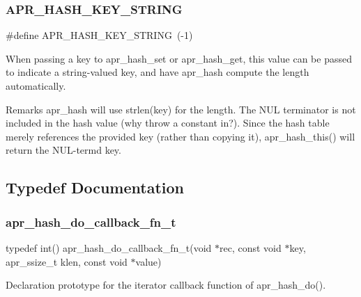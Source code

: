 \subsubsection{\texorpdfstring{A\+P\+R\+\_\+\+H\+A\+S\+H\+\_\+\+K\+E\+Y\+\_\+\+S\+T\+R\+I\+NG}{APR\_HASH\_KEY\_STRING}}
{\footnotesize\ttfamily \#define A\+P\+R\+\_\+\+H\+A\+S\+H\+\_\+\+K\+E\+Y\+\_\+\+S\+T\+R\+I\+NG~(-\/1)}

When passing a key to apr\+\_\+hash\+\_\+set or apr\+\_\+hash\+\_\+get, this value can be passed to indicate a string-\/valued key, and have apr\+\_\+hash compute the length automatically.

\begin{DoxyRemark}{Remarks}
apr\+\_\+hash will use strlen(key) for the length. The N\+UL terminator is not included in the hash value (why throw a constant in?). Since the hash table merely references the provided key (rather than copying it), apr\+\_\+hash\+\_\+this() will return the N\+U\+L-\/term\textquotesingle{}d key. 
\end{DoxyRemark}


\subsection{Typedef Documentation}
\mbox{\label{group__apr__hash_gafaf9b4435ab207b7708533cb8544face}} 
\subsubsection{\texorpdfstring{apr\+\_\+hash\+\_\+do\+\_\+callback\+\_\+fn\+\_\+t}{apr\_hash\_do\_callback\_fn\_t}}
{\footnotesize\ttfamily typedef int() apr\+\_\+hash\+\_\+do\+\_\+callback\+\_\+fn\+\_\+t(void $\ast$rec, const void $\ast$key, apr\+\_\+ssize\+\_\+t klen, const void $\ast$value)}

Declaration prototype for the iterator callback function of apr\+\_\+hash\+\_\+do().


